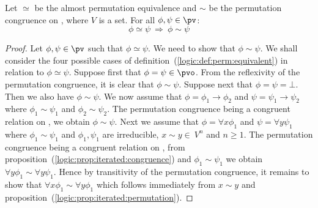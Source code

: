 \begin{prop}\label{logic:prop:perm:implies:perm:congruence}
Let $\simeq$ be the almost permutation equivalence and $\sim$ be the
permutation congruence on \pv, where $V$ is a set. For all
$\phi,\psi\in\pv$:
    \[
    \phi\simeq\psi\ \Rightarrow\ \phi\sim\psi
    \]
\end{prop}
\begin{proof}
Let $\phi,\psi\in\pv$ such that $\phi\simeq\psi$. We need to show
that $\phi\sim\psi$. We shall consider the four possible cases of
definition~(\ref{logic:def:perm:equivalent}) in relation to
$\phi\simeq\psi$. Suppose first that $\phi=\psi\in\pvo$. From the
reflexivity of the permutation congruence, it is clear that
$\phi\sim\psi$. Suppose next that $\phi=\psi=\bot$. Then we also
have $\phi\sim\psi$. We now assume that $\phi=\phi_{1}\to\phi_{2}$
and $\psi=\psi_{1}\to\psi_{2}$ where $\phi_{1}\sim\psi_{1}$ and
$\phi_{2}\sim\psi_{2}$. The permutation congruence being a congruent
relation on \pv, we obtain $\phi\sim\psi$. Next we assume that
$\phi=\forall x\phi_{1}$ and $\psi=\forall y\psi_{1}$ where
$\phi_{1}\sim\psi_{1}$ and $\phi_{1},\psi_{1}$ are irreducible,
$x\sim y\in\ V^{n}$ and $n\geq 1$. The permutation congruence being
a congruent relation on \pv, from
proposition~(\ref{logic:prop:iterated:congruence}) and
$\phi_{1}\sim\psi_{1}$ we obtain $\forall y\phi_{1}\sim\forall
y\psi_{1}$. Hence by transitivity of the permutation congruence, it
remains to show that $\forall x\phi_{1}\sim \forall y\phi_{1}$ which
follows immediately from $x\sim y$ and
proposition~(\ref{logic:prop:iterated:permutation}).
\end{proof}

